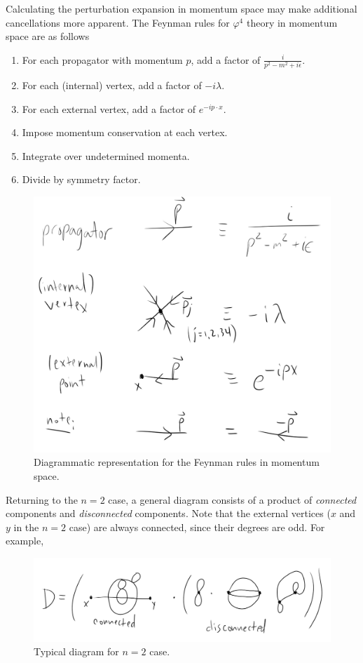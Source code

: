 \noindent Calculating the perturbation expansion in momentum space may make additional cancellations more apparent. The Feynman rules for $\varphi^4$ theory in momentum space are as follows
\begin{enumerate}
\item For each propagator with momentum $p$, add a factor of $\frac{i}{p^2-m^2+i\epsilon}$.
\item For each (internal) vertex, add a factor of $-i\lambda$.
\item For each external vertex, add a factor of $e^{-ip\cdot x}$.
\item Impose momentum conservation at each vertex.
\item Integrate over undetermined momenta.
\item Divide by symmetry factor.
\end{enumerate}

\begin{figure}[H]
	\centering
	\includegraphics[scale=0.6]{feynmanmom.png}
	\caption{Diagrammatic representation for the Feynman rules in momentum space.}
\end{figure}

\noindent Returning to the $n=2$ case, a general diagram consists of a product of \textit{connected} components and \textit{disconnected} components. Note that the external vertices ($x$ and $y$ in the $n=2$ case) are always connected, since their degrees are odd. For example,

\begin{figure}[H]
	\centering
	\includegraphics[scale=0.4]{n2diagrams.png}
	\caption{Typical diagram for $n=2$ case.}
\end{figure}

